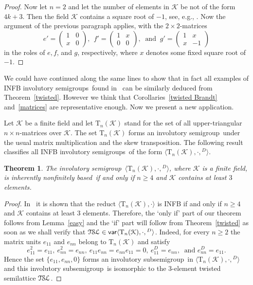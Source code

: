 \documentclass[smallextended]{svjour3}
\newcommand{\sgp}{semi\-group}
\newcommand{\is}{involutory semi\-group}
\newcommand{\iss}{involutory semi\-groups}
\newcommand{\infb}{inherently non\-finitely based}
\newcommand{\TSL}{\ensuremath{\mathcal{T\kern-.5pt S\kern-.5pt L}}}
\newtheorem{Thm}{Theorem}[section]
\DeclareMathOperator{\var}{\mathsf{var}}
\begin{document}
\begin{proof}
Now let $n=2$ and let the number of elements in $\mathcal{K}$ be not of the form $4k+3$. Then the field $\mathcal{K}$ contains a square
root of ${-1}$, see, e.g., \cite[Theorem~3.75]{LidlNiederreiter}. Now the argument of the previous paragraph applies, with the $2\times
2$-matrices
$$e'=\begin{pmatrix}
1 & 0 \\
x & 0
\end{pmatrix},\ \ f'=
\begin{pmatrix}
1 & x\\
0 & 0
\end{pmatrix},\ \text{ and }\
g'=
\begin{pmatrix}
1 & x \\
x & -1
\end{pmatrix}$$
in the roles of $e,f$, and $g$, respectively, where $x$ denotes some fixed square root of $-1$.
\end{proof}

We could have continued along the same lines to show that in fact all examples of INFB \iss\ found in~\cite{Dolinka:2010,ADV:2012} can be
similarly deduced from Theorem~\ref{twisted}. However we think that Corollaries~\ref{twisted Brandt} and~\ref{matrices} are representative
enough. Now we present a new application.

Let $\mathcal{K}$ be a finite field and let $\mathrm{T}_n(\mathcal{K})$ stand for the set of all upper-triangular $n\times n$-matrices over
$\mathcal{K}$. The set $\mathrm{T}_n(\mathcal{K})$ forms an \is\ under the usual matrix multiplication and the skew transposition. The
following result classifies all INFB \iss\ of the form $\langle\mathrm{T}_n(\mathcal{K}),\cdot,{}^D\rangle$.

\begin{Thm}
\label{triangular} The \is\ $\langle\mathrm{T}_n(\mathcal{K}),\cdot,{}^D\rangle$, where $\mathcal{K}$ is a finite field, is \infb\ if and
only if $n\ge 4$ and $\mathcal{K}$ contains at least $3$ elements.
\end{Thm}

\begin{proof}
In~\cite{Goldberg&Volkov:2003} it is shown that the reduct $\langle\mathrm{T}_n(\mathcal{K}),\cdot\rangle$ is INFB if and only if $n\ge 4$
and $\mathcal{K}$ contains at least $3$ elements. Therefore, the `only if' part of our theorem follows from Lemma~\ref{easy} and the `if'
part will follow from Theorem~\ref{twisted} as soon as we shall verify that
$\TSL\in\var\langle\mathrm{T}_n(\mathcal{K}),\cdot,{}^D\rangle$. Indeed, for every $n\ge2$ the matrix units $e_{11}$ and $e_{nn}$ belong to
$\mathrm{T}_n(\mathcal{K})$ and satisfy
$$e_{11}^2=e_{11},\ e_{nn}^2=e_{nn},\ e_{11}e_{nn}=e_{nn}e_{11}=0,\ e_{11}^D=e_{nn},\ \text{ and } e_{nn}^D=e_{11}.$$
Hence the set $\{e_{11},e_{nn},0\}$ forms an involutory sub\sgp\ in $\langle\mathrm{T}_n(\mathcal{K}),\cdot,{}^D\rangle$ and this
involutory sub\sgp\ is isomorphic to the 3-element twisted semilattice $\TSL$.
\end{proof}
\end{document}
